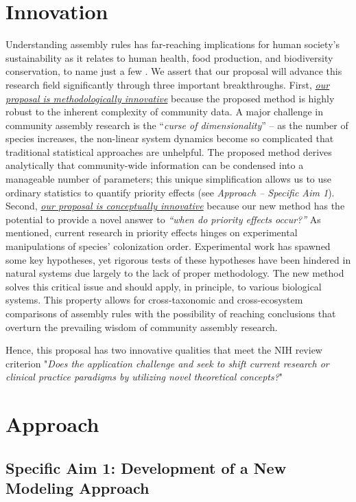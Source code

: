 \documentclass[12pt, class=article, crop=false]{standalone}
\begin{document}
\section{Innovation}
Understanding assembly rules has far-reaching implications for human society's sustainability as it relates to human health, food production, and biodiversity conservation, to name just a few \citep{fukami_historical_2015}.
We assert that our proposal will advance this research field significantly through three important breakthroughs.
First, \ul{\emph{our proposal is methodologically innovative}} because the proposed method is highly robust to the inherent complexity of community data.
A major challenge in community assembly research is the ``\textit{curse of dimensionality}'' -- as the number of species increases, the non-linear system dynamics become so complicated that traditional statistical approaches are unhelpful.
The proposed method derives analytically that community-wide information can be condensed into a manageable number of parameters; this unique simplification allows us to use ordinary statistics to quantify priority effects (see \textit{Approach -- Specific Aim 1}).
Second, \ul{\emph{our proposal is conceptually innovative}} because our new method has the potential to provide a novel answer to \textit{``when do priority effects occur?''}
As mentioned, current research in priority effects hinges on experimental manipulations of species' colonization order.
Experimental work has spawned some key hypotheses, yet rigorous tests of these hypotheses have been hindered in natural systems due largely to the lack of proper methodology. 
The new method solves this critical issue and should apply, in principle, to various biological systems.
This property allows for cross-taxonomic and cross-ecosystem comparisons of assembly rules with
the possibility of reaching conclusions that overturn the prevailing wisdom of community assembly research.

Hence, this proposal has two innovative qualities that meet the NIH review criterion "\emph{Does the application challenge and seek to shift current research or clinical practice paradigms by utilizing novel theoretical concepts?}"

\section{Approach}

\subsection*{Specific Aim 1: Development of a New Modeling Approach}
\end{document}
